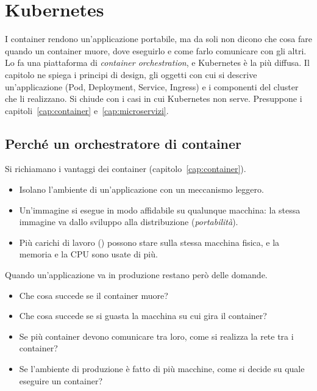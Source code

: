 \chapter{Kubernetes}
\label{cap:kubernetes}

\begin{inbreve}
I container rendono un'applicazione portabile, ma da soli non dicono che cosa fare quando un container muore, dove
eseguirlo e come farlo comunicare con gli altri. Lo fa una piattaforma di \emph{container orchestration}, e Kubernetes
è la più diffusa. Il capitolo ne spiega i principi di design, gli oggetti con cui si descrive un'applicazione (Pod,
Deployment, Service, Ingress) e i componenti del cluster che li realizzano. Si chiude con i casi in cui Kubernetes non
serve. Presuppone i capitoli~\ref{cap:container} e~\ref{cap:microservizi}.
\end{inbreve}

\section{Perché un orchestratore di container}
\label{sec:k8s-perche}

Si richiamano i vantaggi dei container (capitolo~\ref{cap:container}).
\begin{itemize}
  \item Isolano l'ambiente di un'applicazione con un meccanismo leggero.
  \item Un'immagine si esegue in modo affidabile su qualunque macchina: la stessa immagine va dallo sviluppo alla
    distribuzione (\emph{portabilità}).
  \item Più carichi di lavoro () possono stare sulla stessa macchina fisica, e la memoria e la CPU
    sono usate di più.
\end{itemize}

Quando un'applicazione va in produzione restano però delle domande.
\begin{itemize}
  \item Che cosa succede se il container muore?
  \item Che cosa succede se si guasta la macchina su cui gira il container?
  \item Se più container devono comunicare tra loro, come si realizza la rete tra i container?
  \item Se l'ambiente di produzione è fatto di più macchine, come si decide su quale eseguire un container?
\end{itemize}


